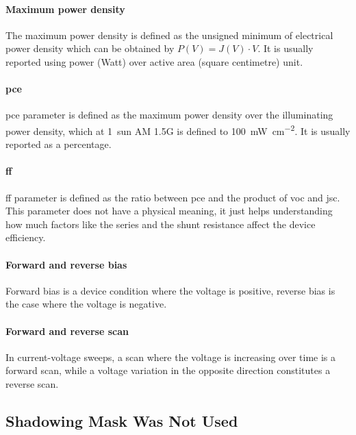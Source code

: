 \paragraph{Maximum power density} The maximum power density is defined as the unsigned minimum of electrical power density which can be obtained by $P(V) = J(V) \cdot V$. It is usually reported using power (Watt) over active area (square centimetre) unit.

\paragraph{\Glsdesc{pce}} \Gls{pce} parameter is defined as the maximum power density over the illuminating power density, which at 1~sun AM 1.5G is defined to \SI{100}{\mW\per\square\cm}. It is usually reported as a percentage.

\paragraph{\Glsdesc{ff}} \Gls{ff} parameter is defined as the ratio between \gls{pce} and the product of \gls{voc} and \gls{jsc}. This parameter does not have a physical meaning, it just helps understanding how much factors like the series and the shunt resistance affect the device efficiency.

\paragraph{Forward and reverse bias} Forward bias is a device condition where the voltage is positive, reverse bias is the case where the voltage is negative.

\paragraph{Forward and reverse scan} In current-voltage sweeps, a scan where the voltage is increasing over time is a forward scan, while a voltage variation in the opposite direction constitutes a reverse scan.

\subsection{Shadowing Mask Was Not Used}


